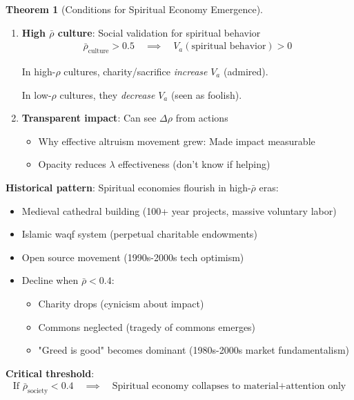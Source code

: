 \documentclass[11pt,a4paper]{article}
\theoremstyle{definition}
\newtheorem{theorem}{Theorem}[section]
\theoremstyle{remark}
\begin{document}
\begin{small}
\begin{enumerate}
\begin{theorem}[Conditions for Spiritual Economy Emergence]
\begin{enumerate}
    \item \textbf{High \(\bar{\rho}\) culture}: Social validation for spiritual behavior
        \begin{align}
        \bar{\rho}_{\text{culture}} > 0.5 \quad \implies \quad V_a(\text{spiritual behavior}) > 0
        \end{align}
        
        In high-\(\rho\) cultures, charity/sacrifice \textit{increase} \(V_a\) (admired).
        
        In low-\(\rho\) cultures, they \textit{decrease} \(V_a\) (seen as foolish).
    
    \item \textbf{Transparent impact}: Can see \(\Delta\rho\) from actions
        \begin{itemize}
            \item Why effective altruism movement grew: Made impact measurable
            \item Opacity reduces \(\lambda\) effectiveness (don't know if helping)
        \end{itemize}
\end{enumerate}

\textbf{Historical pattern}: Spiritual economies flourish in high-\(\bar{\rho}\) eras:
\begin{itemize}
    \item Medieval cathedral building (100+ year projects, massive voluntary labor)
    \item Islamic waqf system (perpetual charitable endowments)
    \item Open source movement (1990s-2000s tech optimism)
\end{itemize}

\begin{itemize}
    \item Decline when \(\bar{\rho} < 0.4\):
    \begin{itemize}
        \item Charity drops (cynicism about impact)
        \item Commons neglected (tragedy of commons emerges)
        \item "Greed is good" becomes dominant (1980s-2000s market fundamentalism)
    \end{itemize}
\end{itemize}

\textbf{Critical threshold}:
\begin{align}
\text{If } \bar{\rho}_{\text{society}} < 0.4 \quad \implies \quad \text{Spiritual economy collapses to material+attention only}
\end{align}


\end{theorem}
\end{enumerate}
\end{small}
\end{document}
